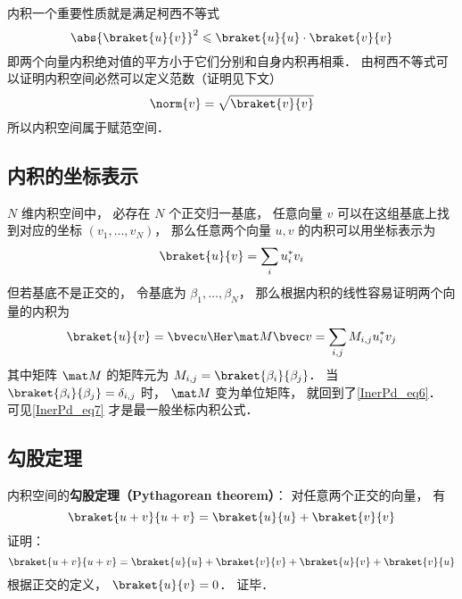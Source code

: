内积一个重要性质就是满足柯西不等式
\begin{equation}
\abs{\braket{u}{v}}^2 \leqslant \braket{u}{u} \cdot \braket{v}{v}
\end{equation}
即两个向量内积绝对值的平方小于它们分别和自身内积再相乘． 由柯西不等式可以证明内积空间必然可以定义范数（证明见下文）
\begin{equation}\label{InerPd_eq8}
\norm{v} = \sqrt{\braket{v}{v}}
\end{equation}
所以内积空间属于赋范空间．

\subsection{内积的坐标表示}
$N$ 维内积空间中， 必存在 $N$ 个正交归一基底， 任意向量 $v$ 可以在这组基底上找到对应的坐标 $(v_1, \dots, v_N)$， 那么任意两个向量 $u, v$ 的内积可以用坐标表示为
\begin{equation}\label{InerPd_eq6}
\braket{u}{v} = \sum_i u_i^* v_i
\end{equation}
但若基底不是正交的， 令基底为 $\beta_1, \dots, \beta_N$， 那么根据内积的线性容易证明两个向量的内积为
\begin{equation}\label{InerPd_eq7}
\braket{u}{v} = \bvec u\Her \mat M \bvec v = \sum_{i,j} M_{i,j} u_i^* v_j
\end{equation}
其中矩阵 $\mat M$ 的矩阵元为 $M_{i,j} = \braket{\beta_i}{\beta_j}$． 当 $\braket{\beta_i}{\beta_j} = \delta_{i,j}$ 时， $\mat M$ 变为单位矩阵， 就回到了\autoref{InerPd_eq6}． 可见\autoref{InerPd_eq7} 才是最一般坐标内积公式．

\subsection{勾股定理}
内积空间的\textbf{勾股定理（Pythagorean theorem）}： 对任意两个正交的向量， 有
\begin{equation}\label{InerPd_eq1}
\braket{u + v}{u + v} = \braket{u}{u} + \braket{v}{v}
\end{equation}
证明：
\begin{equation}
\braket{u + v}{u + v} = \braket{u}{u} + \braket{v}{v} + \braket{u}{v} + \braket{v}{u}
\end{equation}
根据正交的定义， $\braket{u}{v} = 0$． 证毕．


